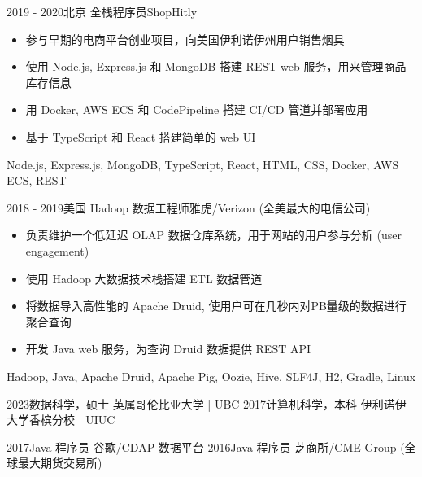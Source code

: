 \documentclass[alternative]{resume_template}
\begin{document}
\begin{experiences}
    \experience
    {2019 - 2020}{北京}
    {全栈程序员}{ShopHitly}
    {
        \begin{itemize}
            \item 参与早期的电商平台创业项目，向美国伊利诺伊州用户销售烟具
            \item 使用 Node.js, Express.js 和 MongoDB 搭建 REST web 服务，用来管理商品库存信息
            \item 用 Docker, AWS ECS 和 CodePipeline 搭建 CI/CD 管道并部署应用
            \item 基于 TypeScript 和 React 搭建简单的 web UI
        \end{itemize}
    }
    {Node.js, Express.js, MongoDB, TypeScript, React, HTML, CSS, Docker, AWS ECS, REST}

    \experience
    {2018 - 2019}{美国}
    {Hadoop 数据工程师}{雅虎/Verizon (全美最大的电信公司)}
    {
        \begin{itemize}
            \item 负责维护一个低延迟 OLAP 数据仓库系统，用于网站的用户参与分析 (user engagement)
            \item 使用 Hadoop 大数据技术栈搭建 ETL 数据管道
            \item 将数据导入高性能的 Apache Druid, 使用户可在几秒内对PB量级的数据进行聚合查询
            \item 开发 Java web 服务，为查询 Druid 数据提供 REST API
        \end{itemize}
    }
    {Hadoop, Java, Apache Druid, Apache Pig, Oozie, Hive, SLF4J, H2, Gradle, Linux}

\end{experiences}

\twocolumnsection
{
    \begin{internships}
        \internship 
        {2023}{数据科学，硕士}
        {英属哥伦比亚大学 | UBC}
        \vspace{5pt}
        \internship
        {2017}{计算机科学，本科}
        {伊利诺伊大学香槟分校 | UIUC}
    \end{internships}
}
{
    \begin{internships}
        \internship
        {2017}{Java 程序员}
        {谷歌/CDAP 数据平台}
        \vspace{5pt}
        \internship
        {2016}{Java 程序员}
        {芝商所/CME Group (全球最大期货交易所)}
    \end{internships}
}
\end{document}
